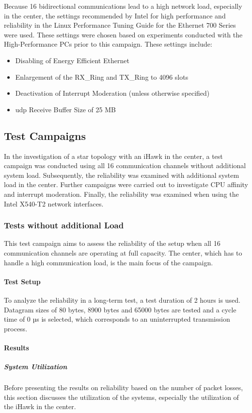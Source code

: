 Because 16 bidirectional communications lead to a high network load, especially in the center, the settings recommended by Intel for high performance and reliability in the Linux Performance Tuning Guide for the Ethernet 700 Series \cite{intermod03} were used. These settings were chosen based on experiments conducted with the High-Performance PCs prior to this campaign. These settings include:
\begin{itemize}
  \item Disabling of Energy Efficient Ethernet
  \item Enlargement of the RX\_Ring and TX\_Ring to 4096 slots
  \item Deactivation of Interrupt Moderation (unless otherwise specified)
  \item \ac{udp} Receive Buffer Size of 25 MB
\end{itemize}

\subsection{Test Campaigns}
In the investigation of a star topology with an iHawk in the center, a test campaign was conducted using all 16 communication channels without additional system load. Subsequently, the reliability was examined with additional system load in the center. Further campaigns were carried out to investigate \ac{CPU} affinity and interrupt moderation. Finally, the reliability was examined when using the Intel X540-T2 network interfaces.

\subsubsection{Tests without additional Load} \label{chap:noaddloadTest}
This test campaign aims to assess the reliability of the setup when all 16 communication channels are operating at full capacity. The center, which has to handle a high communication load, is the main focus of the campaign.

\paragraph{Test Setup}
To analyze the reliability in a long-term test, a test duration of 2 hours is used. Datagram sizes of 80 bytes, 8900 bytes and 65000 bytes are tested and a cycle time of 0 µs is selected, which corresponds to an uninterrupted transmission process.

\paragraph{Results}
\subparagraph{System Utilization}
Before presenting the results on reliability based on the number of packet losses, this section discusses the utilization of the systems, especially the utilization of the iHawk in the center.

